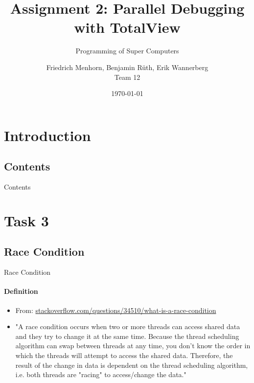\documentclass[9pt,pdftex]{beamer}
\title{Assignment 2: Parallel Debugging with TotalView}
\subtitle{Programming of Super Computers}
\author[Friedrich Menhorn, Benjamin Rüth, Erik Wannerberg] {Friedrich Menhorn, Benjamin Rüth, Erik Wannerberg \\ Team 12} %
\date{\today}
\institute{Technische Universität München}
\begin{document}
\frame{\maketitle}

\section{Introduction}
\subsection{Contents}
\begin{frame}{Contents}
\tableofcontents
\end{frame}

\section{Task 3}
\subsection{Race Condition}
\begin{frame}{Race Condition}
\framesubtitle{Definition}
\begin{itemize}
\item From: \url{stackoverflow.com/questions/34510/what-is-a-race-condition}
\item[] "A race condition occurs when two or more threads can access shared data and they try to change it at the same time. Because the thread scheduling algorithm can swap between threads at any time, you don't know the order in which the threads will attempt to access the shared data. Therefore, the result of the change in data is dependent on the thread scheduling algorithm, i.e. both threads are "racing" to access/change the data."
\end{itemize}
\end{frame}
\end{document}
